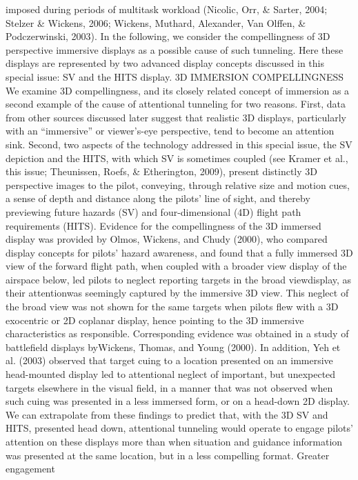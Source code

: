 \documentclass[utf8,bachelor,manualbib]{gradu3}
\begin{document}
imposed during periods of multitask workload (Nicolic, Orr, \& Sarter, 2004;
Stelzer \& Wickens, 2006; Wickens, Muthard, Alexander, Van Olffen, \& Podczerwinski,
2003). In the following, we consider the compellingness of 3D perspective
immersive displays as a possible cause of such tunneling. Here these displays
are represented by two advanced display concepts discussed in this special
issue: SV and the HITS display. 3D IMMERSION COMPELLINGNESS
We examine 3D compellingness, and its closely related concept of immersion as a
second example of the cause of attentional tunneling for two reasons. First, data
from other sources discussed later suggest that realistic 3D displays, particularly
with an “immersive” or viewer’s-eye perspective, tend to become an attention sink.
Second, two aspects of the technology addressed in this special issue, the SV depiction
and the HITS, with which SV is sometimes coupled (see Kramer et al., this
issue; Theunissen, Roefs, \& Etherington, 2009), present distinctly 3D perspective
images to the pilot, conveying, through relative size and motion cues, a sense of
depth and distance along the pilots’ line of sight, and thereby previewing future
hazards (SV) and four-dimensional (4D) flight path requirements (HITS).
Evidence for the compellingness of the 3D immersed display was provided by
Olmos, Wickens, and Chudy (2000), who compared display concepts for pilots’
hazard awareness, and found that a fully immersed 3D view of the forward flight
path, when coupled with a broader view display of the airspace below, led pilots to
neglect reporting targets in the broad viewdisplay, as their attentionwas seemingly
captured by the immersive 3D view. This neglect of the broad view was not shown
for the same targets when pilots flew with a 3D exocentric or 2D coplanar display,
hence pointing to the 3D immersive characteristics as responsible. Corresponding
evidence was obtained in a study of battlefield displays byWickens, Thomas, and
Young (2000). In addition, Yeh et al. (2003) observed that target cuing to a location
presented on an immersive head-mounted display led to attentional neglect of important,
but unexpected targets elsewhere in the visual field, in a manner that was
not observed when such cuing was presented in a less immersed form, or on a
head-down 2D display.
We can extrapolate from these findings to predict that, with the 3D SV and
HITS, presented head down, attentional tunneling would operate to engage pilots’
attention on these displays more than when situation and guidance information was presented at the same location, but in a less compelling format. Greater engagement
\end{document}
